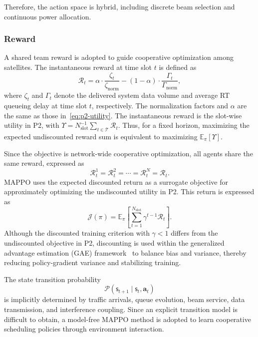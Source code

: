 \documentclass[journal]{IEEEtran}
\begin{document}
Therefore, the action space is hybrid, including discrete beam selection and continuous power allocation.

\subsubsection{Reward}

A shared team reward is adopted to guide cooperative optimization among satellites. The instantaneous reward at time slot $t$ is defined as
\begin{equation}
\mathcal{R}_t=\alpha\cdot\frac{\zeta_t}{\zeta_{\mathrm{norm}}}-(1-\alpha)\cdot\frac{\Gamma_t}{\Gamma_{\mathrm{norm}}},
\label{eq:team-reward}
\end{equation}
where $\zeta_t$ and $\Gamma_t$ denote the delivered system data volume and average RT queueing delay at time slot $t$, respectively. The normalization factors and $\alpha$ are the same as those in~\eqref{eq:p2-utility}. The instantaneous reward is the slot-wise utility in P2, with $\Upsilon=N_{\mathrm{slot}}^{-1}\sum_{t\in\mathcal T}\mathcal R_t$. Thus, for a fixed horizon, maximizing the expected undiscounted reward sum is equivalent to maximizing $\mathbb E_\pi[\Upsilon]$.

Since the objective is network-wide cooperative optimization, all agents share the same reward, expressed as
\begin{equation}
\mathcal{R}_t^1=\mathcal{R}_t^2=\cdots=\mathcal{R}_t^N=\mathcal{R}_t.
\end{equation}
MAPPO uses the expected discounted return as a surrogate objective for approximately optimizing the undiscounted utility in P2. This return is expressed as
\begin{equation}
\mathcal{J}(\pi)=\mathbb{E}_{\pi}\left[\sum_{t=1}^{N_{\mathrm{slot}}}\gamma^{t-1}\mathcal{R}_t\right].
\label{eq:discounted-surrogate}
\end{equation}
Although the discounted training criterion with $\gamma<1$ differs from the undiscounted objective in P2, discounting is used within the generalized advantage estimation (GAE) framework~\cite{refGAE} to balance bias and variance, thereby reducing policy-gradient variance and stabilizing training.

The state transition probability
\begin{equation}
\mathcal{P}(\mathsf{s}_{t+1}\mid\mathsf{s}_t,\mathbf a_t)
\end{equation}
is implicitly determined by traffic arrivals, queue evolution, beam service, data transmission, and interference coupling. Since an explicit transition model is difficult to obtain, a model-free MAPPO method is adopted to learn cooperative scheduling policies through environment interaction.
\end{document}
